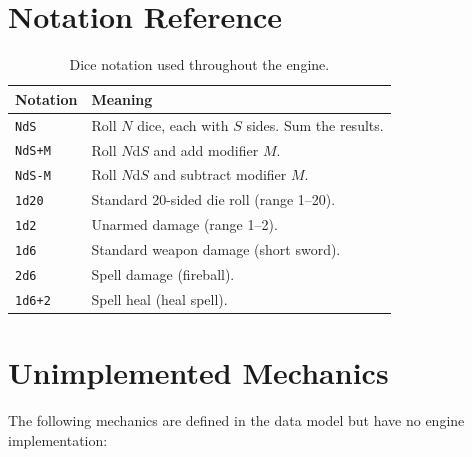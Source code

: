 \documentclass[a4paper,10pt]{article}
\newcommand{\dice}[1]{\texttt{#1}}
\begin{document}
\section{Notation Reference}

\begin{table}[h]
\centering
\begin{tabular}{@{}lp{8cm}@{}}
\toprule
\textbf{Notation} & \textbf{Meaning} \\
\midrule
\dice{NdS}   & Roll $N$ dice, each with $S$ sides. Sum the results. \\
\dice{NdS+M} & Roll $N$d$S$ and add modifier $M$. \\
\dice{NdS-M} & Roll $N$d$S$ and subtract modifier $M$. \\
\dice{1d20}  & Standard 20-sided die roll (range 1--20). \\
\dice{1d2}   & Unarmed damage (range 1--2). \\
\dice{1d6}   & Standard weapon damage (short sword). \\
\dice{2d6}   & Spell damage (fireball). \\
\dice{1d6+2} & Spell heal (heal spell). \\
\bottomrule
\end{tabular}
\caption{Dice notation used throughout the engine.}
\end{table}

\section{Unimplemented Mechanics}
\label{sec:unimplemented}

The following mechanics are defined in the data model but have no
engine implementation:
\end{document}
